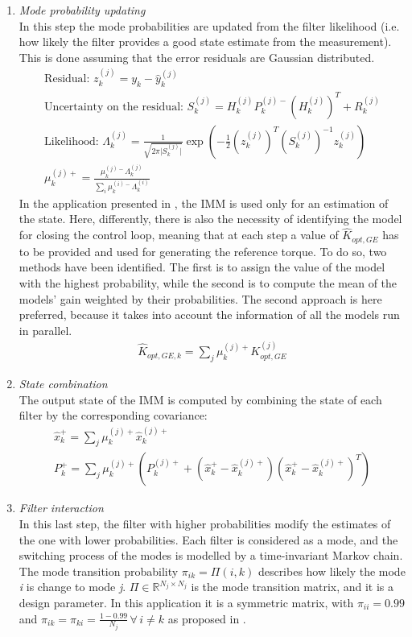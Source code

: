 \begin{enumerate}
\item \textit{Mode probability updating}\\
In this step the mode probabilities are updated from the filter likelihood (i.e. how likely the filter provides a good state estimate from the measurement). This is done assuming that the error residuals are Gaussian distributed.  
\begin{gather}
  \text{Residual: } z_k^{(j)} = y_k - \hat{y}_k^{(j)}\\
  \text{Uncertainty on the residual: }S_k^{(j)} = H_k^{(j)} P_k^{(j)-} (H_k^{(j)})^T + R_k^{(j)}\\
  \text{Likelihood: } \Lambda_k^{(j)} = \frac{1}{\sqrt{2 \pi \lvert S_k^{(j)} \rvert}} \exp{\left(-\frac{1}{2}\left(z_k^{(j)}\right)^T \left(S_k^{(j)}\right)^{-1} z_k^{(j)}\right)}\\
  \mu_k^{(j)+} = \frac{\mu_k^{(j)-}\Lambda_k^{(j)}}{\sum_{i} \mu_k^{(i)-}\Lambda_k^{(i)}}
\end{gather}
In the application presented in \cite{kalman_based_IMM}, the IMM is used only for an estimation of the state. Here, differently, there is also the necessity of identifying the model for closing the control loop, meaning that at each step a value of $\hat{K}_{opt,GE}$ has to be provided and used for generating the reference torque. To do so, two methods have been identified. The first is to assign the value of the model with the highest probability, while the second is to compute the mean of the models' gain weighted by their probabilities. The second approach is here preferred, because it takes into account the information of all the models run in parallel.
\begin{gather}
\hat{K}_{opt,GE,k} = \sum_j \mu_k^{(j)+} K_{opt,GE}^{(j)}
\end{gather}

\item \textit{State combination}\\
The output state of the IMM is computed by combining the state of each filter by the corresponding covariance:
\begin{gather}
  \hat{x}_k^+ = \sum_j \mu_k^{(j)+} \hat{x}_k^{(j)+}\\
  P_k^+ = \sum_j \mu_k^{(j)+} \left(P_k^{(j)+} + \left(\hat{x}_k^+ - \hat{x}_k^{(j)+}\right)\left(\hat{x}_k^+ - \hat{x}_k^{(j)+}\right)^T\right)
\end{gather}

\item \textit{Filter interaction}\\
In this last step, the filter with higher probabilities modify the estimates of the one with lower probabilities. Each filter is considered as a mode, and the switching process of the modes is modelled by a time-invariant Markov chain. The mode transition probability $\pi_{ik} = \Pi(i, k)$ describes how likely the mode \textit{i} is change to mode \textit{j}. $\Pi \in \mathbb{R}^{N_j \times N_j}$ is the mode transition matrix, and it is a design parameter. In this application it is a symmetric matrix, with $\pi_{ii}=0.99$ and $\pi_{ik}=\pi_{ki}=\frac{1 - 0.99}{N_j} \,\forall \, i\neq k $ as proposed in \cite{kalman_based_IMM}.


\end{enumerate}
